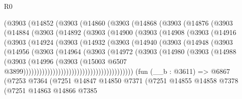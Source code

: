 \begin{lexlean}{R0}
\begin{coremodule}
      (@3903
        (@14852
          (@3903
            (@14860
              (@3903
                (@14868
                  (@3903
                    (@14876
                      (@3903
                        (@14884
                          (@3903
                            (@14892
                              (@3903
                                (@14900
                                  (@3903
                                    (@14908
                                      (@3903
                                        (@14916
                                          (@3903
                                            (@14924
                                              (@3903
                                                (@14932
                                                  (@3903
                                                    (@14940
                                                      (@3903
                                                        (@14948
                                                          (@3903
                                                            (@14956
                                                              (@3903
                                                                (@14964
                                                                  (@3903
                                                                    (@14972
                                                                      (@3903
                                                                        (@14980
                                                                          (@3903
                                                                            (@14988
                                                                              (@3903
                                                                                (@14996
                                                                                  (@3903
                                                                                    (@15003
                                                                                      @6507
                                                                                      @3899)))))))))))))))))))))))))))))))))))))))))
    (fun (__b : @3611) =>
    @6867
      (@7253
        @7364
        (@7251
          @14847
          @14850
          @7371
          (@7251
            @14855
            @14858
            @7378
            (@7251
              @14863
              @14866
              @7385

\end{coremodule}
\end{lexlean}
